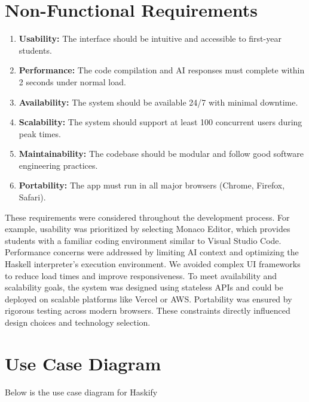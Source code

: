 \section{Non-Functional Requirements}

\begin{enumerate}[label=NFR\arabic*:]
  \item \textbf{Usability:} The interface should be intuitive and accessible to first-year students.
  \item \textbf{Performance:} The code compilation and AI responses must complete within 2 seconds under normal load.
  \item \textbf{Availability:} The system should be available 24/7 with minimal downtime.
  \item \textbf{Scalability:} The system should support at least 100 concurrent users during peak times.
  \item \textbf{Maintainability:} The codebase should be modular and follow good software engineering practices.
  \item \textbf{Portability:} The app must run in all major browsers (Chrome, Firefox, Safari).
\end{enumerate}
These requirements were considered throughout the development process. For example, usability was prioritized by selecting Monaco Editor, which provides students with a familiar coding environment similar to Visual Studio Code. Performance concerns were addressed by limiting AI context and optimizing the Haskell interpreter's execution environment. We avoided complex UI frameworks to reduce load times and improve responsiveness.
To meet availability and scalability goals, the system was designed using stateless APIs and could be deployed on scalable platforms like Vercel or AWS. Portability was ensured by rigorous testing across modern browsers. These constraints directly influenced design choices and technology selection.

\newpage
\section{Use Case Diagram}

Below is the use case diagram for Haskify

